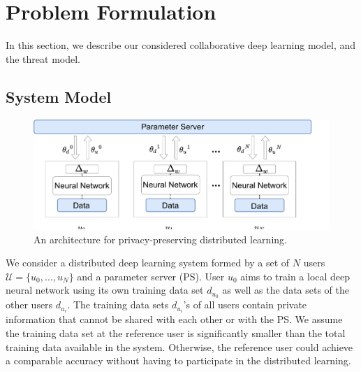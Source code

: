 \documentclass[conference]{IEEEtran}
\begin{document}
\section{Problem Formulation}
In this section, we describe our considered collaborative deep learning model, and the threat model. 

\subsection{System Model} \label{sec:systemModel}
\begin{figure}[t]
\includegraphics[width=\textwidth, keepaspectratio]{HighLevelArch}
\caption{An architecture for privacy-preserving distributed learning.}
\label{fig:HighLevel}
\end{figure}
We consider a distributed deep learning system formed by a set of $N$ users $\mathcal{U}= \{u_0, \dots,u_N\}$ and
a parameter server (PS). User $u_0$ aims to train a local deep neural network using its own training data set
$d_{u_0}$ as well as the data sets of the other users $d_{u_i}$. %
The training data sets $d_{u_i}$'s of all users contain private information that cannot be shared with each other or with the PS.  We
assume the training data set at the reference user is significantly smaller  than the total training data available in the system.
Otherwise, the reference user could achieve a comparable accuracy without having to participate in the distributed learning. 
\end{document}
